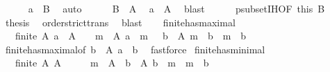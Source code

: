 \begin{isabellebody}
\ \ \ \ \isamarkupfalse%
\ {\isachardoublequoteopen}a\ {\isasymnotin}\ {\isacharquery}{\kern0pt}B{\isachardoublequoteclose}\ \isamarkupfalse%
\ auto\isanewline
\ \ \ \ \isamarkupfalse%
\ {\isachardoublequoteopen}{\isacharquery}{\kern0pt}B\ {\isasymsubset}\ A{\isachardoublequoteclose}\ \isamarkupfalse%
\ {\isacartoucheopen}a\ {\isasymin}\ A{\isacartoucheclose}\ \isamarkupfalse%
\ blast\isanewline
\ \ \ \ \isamarkupfalse%
\ psubset{\isachardot}{\kern0pt}IH{\isacharbrackleft}{\kern0pt}OF\ this\ {\isacartoucheopen}{\isacharquery}{\kern0pt}B\ {\isasymnoteq}\ {\isacharbraceleft}{\kern0pt}{\isacharbraceright}{\kern0pt}{\isacartoucheclose}{\isacharbrackright}{\kern0pt}\ \isamarkupfalse%
\ {\isacharquery}{\kern0pt}thesis\ \isamarkupfalse%
\ order{\isachardot}{\kern0pt}strict{\isacharunderscore}{\kern0pt}trans{}\ \isamarkupfalse%
\ blast\isanewline
\ \ \isamarkupfalse%
\isanewline
{}\isamarkupfalse%
%
\endisatagproof
{\isafoldproof}%
%
\isadelimproof
\isanewline
%
\endisadelimproof
\isanewline
{}\isamarkupfalse%
\ finite{\isacharunderscore}{\kern0pt}has{\isacharunderscore}{\kern0pt}maximal{}{\isacharcolon}{\kern0pt}\isanewline
\ \ {\isachardoublequoteopen}{\isasymlbrakk}\ finite\ A{\isacharsemicolon}{\kern0pt}\ a\ {\isasymin}\ A\ {\isasymrbrakk}\ {\isasymLongrightarrow}\ {\isasymexists}\ m\ {\isasymin}\ A{\isachardot}{\kern0pt}\ a\ {\isasymle}\ m\ {\isasymand}\ {\isacharparenleft}{\kern0pt}{\isasymforall}\ b\ {\isasymin}\ A{\isachardot}{\kern0pt}\ m\ {\isasymle}\ b\ {\isasymlongrightarrow}\ m\ {\isacharequal}{\kern0pt}\ b{\isacharparenright}{\kern0pt}{\isachardoublequoteclose}\isanewline
%
\isadelimproof
%
\endisadelimproof
%
\isatagproof
{}\isamarkupfalse%
\ finite{\isacharunderscore}{\kern0pt}has{\isacharunderscore}{\kern0pt}maximal{\isacharbrackleft}{\kern0pt}of\ {\isachardoublequoteopen}{\isacharbraceleft}{\kern0pt}b\ {\isasymin}\ A{\isachardot}{\kern0pt}\ a\ {\isasymle}\ b{\isacharbraceright}{\kern0pt}{\isachardoublequoteclose}{\isacharbrackright}{\kern0pt}\ \isamarkupfalse%
\ fastforce%
\endisatagproof
{\isafoldproof}%
%
\isadelimproof
\isanewline
%
\endisadelimproof
\isanewline
{}\isamarkupfalse%
\ finite{\isacharunderscore}{\kern0pt}has{\isacharunderscore}{\kern0pt}minimal{\isacharcolon}{\kern0pt}\isanewline
\ \ {\isachardoublequoteopen}{\isasymlbrakk}\ finite\ A{\isacharsemicolon}{\kern0pt}\ A\ {\isasymnoteq}\ {\isacharbraceleft}{\kern0pt}{\isacharbraceright}{\kern0pt}\ {\isasymrbrakk}\ {\isasymLongrightarrow}\ {\isasymexists}\ m\ {\isasymin}\ A{\isachardot}{\kern0pt}\ {\isasymforall}\ b\ {\isasymin}\ A{\isachardot}{\kern0pt}\ b\ {\isasymle}\ m\ {\isasymlongrightarrow}\ m\ {\isacharequal}{\kern0pt}\ b{\isachardoublequoteclose}\isanewline

\end{isabellebody}
